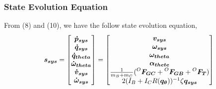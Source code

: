 \subsubsection{State Evolution Equation}
From (8) and (10), we have the follow state evolution equation,
\begin{align*}
  \bm{s_{sys}} =
  \begin{bmatrix}
    \bm{\dot{p}_{sys}} \\
    \bm{\dot{q}_{sys}} \\
    \bm{\dot{q}_{theta}} \\
    \bm{\dot{\omega}_{theta}} \\    
    \bm{\dot{v}_{sys}} \\
    \bm{\dot{\omega}_{sys}} \\    
  \end{bmatrix} =
  \begin{bmatrix}
    \bm{v_{sys}} \\
    \bm{\omega_{sys}} \\
    \bm{\omega_{theta}} \\
    \bm{\alpha_{thete}} \\
    \frac{1}{m_B + m_C} (\prescript{O}{}{\bm{F_{GC}}} + \prescript{O}{}{\bm{F_{GB}}} + \prescript{O}{}{\bm{F_{T}}}) \\
    2(I_B + I_CR(\bm{q_\theta}))^{-1} \zeta \bm{q_{sys}}    
  \end{bmatrix}
\end{align*}

